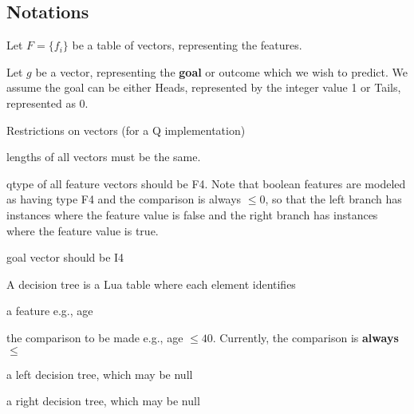\subsection{Notations}

\bi
\item Let \(F = \{f_i\}\) be a table of vectors, representing the features.
\item Let \(g\) be a vector, representing the {\bf goal} or 
outcome which we wish to
predict. We assume the goal can be either Heads, represented by the integer value 1 or Tails, represented as 0.
\item Restrictions on vectors (for a Q implementation)
\be
\item lengths of all vectors must be the same. 
\item qtype of all feature vectors should be F4. 
Note that boolean features are
modeled as having type F4 and the comparison is always \(\leq 0\), so that the
left branch has instances where the feature value is false and the
right branch has instances where the feature value is true.
\item goal vector should be I4
\ee
\ei

A decision tree is a Lua table where each element identifies
\be
\item a feature e.g., age
\item the comparison to be made e.g., age \(\leq 40\). Currently, the comparison
is {\bf always} \(\leq\)
\item a left decision tree, which may be null
\item a right decision tree, which may be null
\ee

